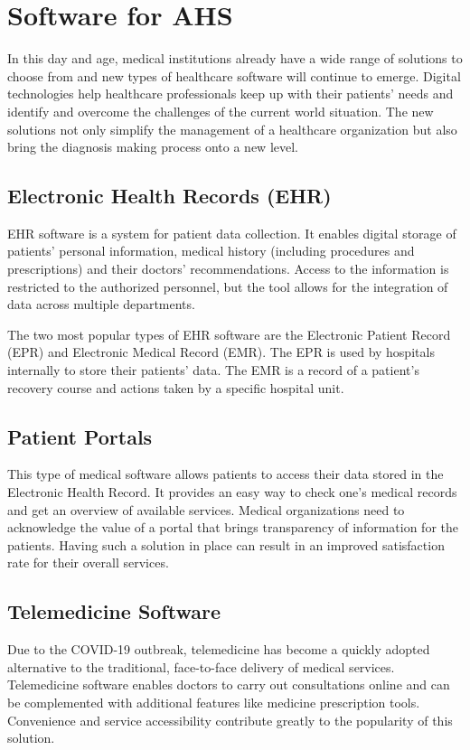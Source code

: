 \documentclass[11pt,a4paper,twoside]{article}
\begin{document}
\section{Software for AHS}
In this day and age, medical institutions already have a wide range of solutions to choose from and new types of healthcare software will continue to emerge. Digital technologies help healthcare professionals keep up with their patients’ needs and identify and overcome the challenges of the current world situation. The new solutions not only simplify the management of a healthcare organization but also bring the diagnosis making process onto a new level.
\subsection{Electronic Health Records (EHR)}
EHR software is a system for patient data collection. It enables digital storage of patients’ personal information, medical history (including procedures and prescriptions) and their doctors’ recommendations. Access to the information is restricted to the authorized personnel, but the tool allows for the integration of data across multiple departments.\par
The two most popular types of EHR software are the Electronic Patient Record (EPR) and Electronic Medical Record (EMR). The EPR is used by hospitals internally to store their patients’ data. The EMR is a record of a patient’s recovery course and actions taken by a specific hospital unit.
\subsection{Patient Portals}
This type of medical software allows patients to access their data stored in the Electronic Health Record. It provides an easy way to check one’s medical records and get an overview of available services. Medical organizations need to acknowledge the value of a portal that brings transparency of information for the patients. Having such a solution in place can result in an improved satisfaction rate for their overall services.
\subsection{Telemedicine Software}
Due to the COVID-19 outbreak, telemedicine has become a quickly adopted alternative to the traditional, face-to-face delivery of medical services. Telemedicine software enables doctors to carry out consultations online and can be complemented with additional features like medicine prescription tools. Convenience and service accessibility contribute greatly to the popularity of this solution.
\end{document}
